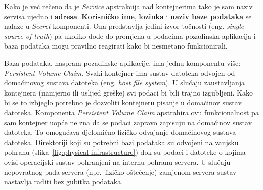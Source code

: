 Kako je već rečeno da je \textit{Service} apstrakcija nad kontejnerima tako je sam naziv servisa ujedno i \textbf{adresa}.
\textbf{Korisničko ime}, \textbf{lozinka} i \textbf{naziv baze podataka} se nalaze u \textit{Secret} komponenti.
Ona predstavlja jedini izvor točnosti (eng. \textit{single source of truth}) pa ukoliko dođe do promjena
u podacima pozadinska aplikacija i baza podataka mogu pravilno reagirati kako bi nesmetano funkcionirali.

Baza podataka, naspram pozadinske aplikacije, ima jednu komponentu više: \textit{Persistent Volume Claim}.
Svaki kontejner ima sustav datoteka odvojen od domaćinovog sustava datoteka (eng. \textit{host file system}).
U slučaju zaustavljanja kontejnera (namjerno ili uslijed greške) svi podaci bi bili trajno izgubljeni.
Kako bi se to izbjeglo potrebno je dozvoliti kontejneru pisanje u domaćinov sustav datoteka.
Komponenta \textit{Persistent Volume Claim} apstrahira ovu funkcionalnost pa sam kontejner uopće ne zna da se podaci zapravo
zapisuju na domaćinov sustav datoteka.
To omogućava djelomično fizičko odvajanje domaćinovog sustava datoteka.
Direktoriji koji su potrebni bazi podataka su odvojeni na vanjsku pohranu (slika~\ref{fig:physical-infrastructure}) dok su
podaci i datoteke o kojima ovisi operacijski sustav pohranjeni na internu pohranu servera.
U slučaju nepovratnog pada servera (npr.~fizičko oštećenje) zamjenom servera sustav nastavlja raditi bez gubitka podataka.
